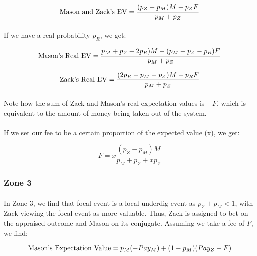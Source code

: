 \documentclass[12pt,letterpaper]{article}
\begin{document}
\begin{equation}
\textnormal{Mason and Zack's EV} = \frac{(p_Z - p_M)M - p_Z F}{p_M + p_Z}
\end{equation}

\paragraph{} If we have a real probability $p_R$, we get:

\begin{equation}
\textnormal{Mason's Real EV} = \frac{p_M + p_Z - 2p_R)M - (p_M + p_Z - p_R)F}{p_M + p_Z}
\end{equation}

\begin{equation}
\textnormal{Zack's Real EV} = \frac{(2p_R - p_M - p_Z)M - p_R F}{p_M + p_Z}
\end{equation}

\paragraph{} Note how the sum of Zack and Mason’s real expectation values is $-F$, which is equivalent to the amount of money being taken out of the system.

\paragraph{} If we set our fee to be a certain proportion of the expected value (x), we get:

\begin{equation}
F = x \frac{(p_Z - p_M)M}{p_M + p_Z + x p_Z}
\end{equation}

\subsubsection*{Zone 3}

\paragraph{} In Zone 3, we find that focal event is a local underdig event as $p_Z + p_M < 1$, with Zack viewing the focal event as more valuable. Thus, Zack is assigned to bet on the appraised outcome and Mason on its conjugate. Assuming we take a fee of $F$, we find:

\begin{equation}
\textnormal{Mason's Expectation Value} = p_M (-Pay_M) + (1 - p_M)(Pay_Z - F) 
\end{equation}
\end{document}
